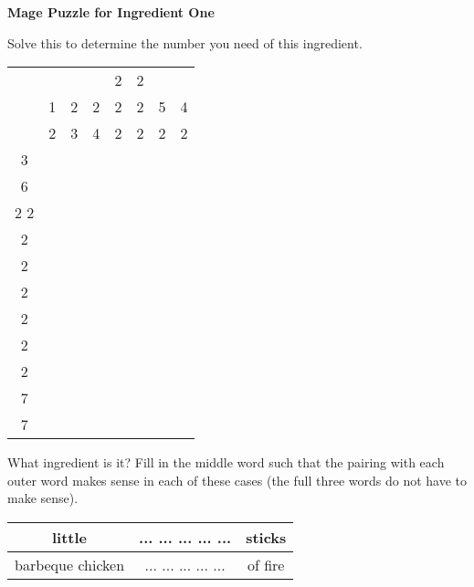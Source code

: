 \documentclass[white]{guildcamp3}
\begin{document}
\name{\wMagePuzzleOne{}} %

\large\textbf{Mage Puzzle for Ingredient One}  

Solve this to determine the number you need of this ingredient. 


\begin{tabular}{|c|c|c|c|c|c|c|c|}
	\hline \rule[-2ex]{0pt}{5.5ex}  &  &  &  & 2 & 2 &  &  \\ 
	  & 1 & 2 & 2 & 2 & 2 & 5 & 4 \\ 
      & 2 & 3 & 4 & 2 & 2 & 2 & 2 \\ 
	\hline \rule[-2ex]{0pt}{5.5ex} 3 &  &  &  &  &  &  &  \\ 
	\hline \rule[-2ex]{0pt}{5.5ex} 6 &  &  &  &  &  &  &  \\ 
	\hline \rule[-2ex]{0pt}{5.5ex} 2 2 &  &  &  &  &  &  &  \\ 
	\hline \rule[-2ex]{0pt}{5.5ex} 2 &  &  &  &  &  &  &  \\ 
	\hline \rule[-2ex]{0pt}{5.5ex} 2 &  &  &  &  &  &  &  \\ 
	\hline \rule[-2ex]{0pt}{5.5ex} 2 &  &  &  &  &  &  &  \\ 
	\hline \rule[-2ex]{0pt}{5.5ex} 2 &  &  &  &  &  &  &  \\ 
	\hline \rule[-2ex]{0pt}{5.5ex} 2 &  &  &  &  &  &  &  \\ 
	\hline \rule[-2ex]{0pt}{5.5ex} 2 &  &  &  &  &  &  &  \\ 
	\hline \rule[-2ex]{0pt}{5.5ex} 7 &  &  &  &  &  &  &  \\ 
	\hline \rule[-2ex]{0pt}{5.5ex} 7 &  &  &  &  &  &  &  \\ 
	\hline 
\end{tabular} 

What ingredient is it? Fill in the middle word such that the pairing with each outer word makes sense in each of these cases (the full three words do not have to make sense).

\begin{tabular}{|c|c|c|}
	\hline \rule[-2ex]{0pt}{5.5ex} little & ... ... ... ... ... & sticks \\ 
	\hline \rule[-2ex]{0pt}{5.5ex} barbeque chicken & ... ... ... ... ... & of fire \\ 
	\hline 
\end{tabular} 

\end{document}
